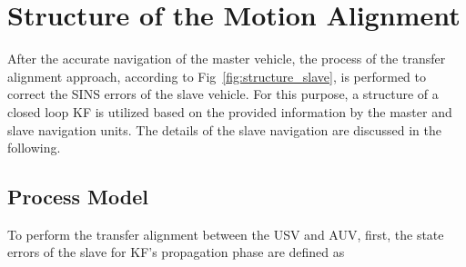 \documentclass[3p]{elsarticle}
\begin{document}


\section{Structure of the Motion Alignment}
\noindent After the accurate navigation of the master vehicle, the process of the transfer alignment approach, according to Fig~\ref{fig:structure_slave}, is performed to correct the SINS errors of the slave vehicle. For this purpose, a structure of a closed loop KF is utilized based on the provided information by the master and slave navigation units. The details of the slave navigation are discussed in the following.



\subsection{Process Model}
\noindent To perform the transfer alignment between the USV and AUV, first, the state errors of the slave for KF's propagation phase are defined as
\end{document}
